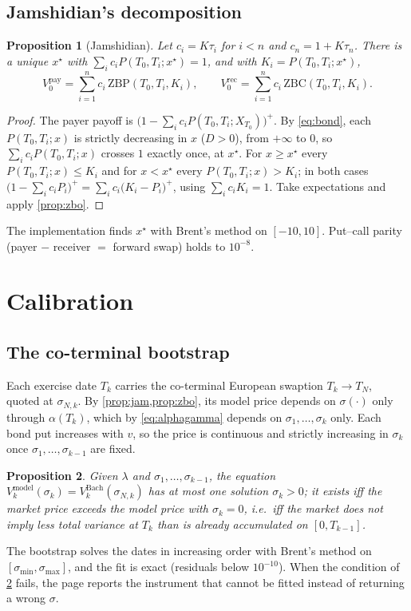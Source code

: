 \documentclass[11pt,a4paper]{article}
\newtheorem{proposition}{Proposition}
\theoremstyle{definition}
\theoremstyle{remark}
\begin{document}
\subsection{Jamshidian's decomposition}
\begin{proposition}[Jamshidian]\label{prop:jam}
Let $c_i=K\tau_i$ for $i<n$ and $c_n=1+K\tau_n$. There is a unique $x^\star$ with $\sum_ic_iP(T_0,T_i;x^\star)=1$, and with
$K_i=P(T_0,T_i;x^\star)$,
\begin{equation}
  V^{\mathrm{pay}}_0=\sum_{i=1}^nc_i\,\mathrm{ZBP}(T_0,T_i,K_i),\qquad V^{\mathrm{rec}}_0=\sum_{i=1}^nc_i\,\mathrm{ZBC}(T_0,T_i,K_i).
\end{equation}
\end{proposition}
\begin{proof}
The payer payoff is $\big(1-\sum_ic_iP(T_0,T_i;X_{T_0})\big)^+$. By \eqref{eq:bond}, each $P(T_0,T_i;x)$ is strictly decreasing
in $x$ ($D>0$), from $+\infty$ to $0$, so $\sum_ic_iP(T_0,T_i;x)$ crosses $1$ exactly once, at $x^\star$. For $x\ge x^\star$ every
$P(T_0,T_i;x)\le K_i$ and for $x<x^\star$ every $P(T_0,T_i;x)>K_i$; in both cases
$\big(1-\sum_ic_iP_i\big)^+=\sum_ic_i\big(K_i-P_i\big)^+$, using $\sum_ic_iK_i=1$. Take expectations and apply \cref{prop:zbo}.
\end{proof}
The implementation finds $x^\star$ with Brent's method on $[-10,10]$. Put--call parity (payer $-$ receiver $=$ forward swap)
holds to $10^{-8}$.

\section{Calibration}\label{sec:calibration}
\subsection{The co-terminal bootstrap}
Each exercise date $T_k$ carries the co-terminal European swaption $T_k\to T_N$, quoted at $\sigma_{N,k}$. By
\cref{prop:jam,prop:zbo}, its model price depends on $\sigma(\cdot)$ only through $\alpha(T_k)$, which by \eqref{eq:alphagamma}
depends on $\sigma_1,\dots,\sigma_k$ only. Each bond put increases with $v$, so the price is continuous and strictly
increasing in $\sigma_k$ once $\sigma_1,\dots,\sigma_{k-1}$ are fixed.
\begin{proposition}\label{prop:boot}
Given $\lambda$ and $\sigma_1,\dots,\sigma_{k-1}$, the equation $V^{\mathrm{model}}_k(\sigma_k)=V^{\mathrm{Bach}}_k(\sigma_{N,k})$
has at most one solution $\sigma_k>0$; it exists iff the market price exceeds the model price with $\sigma_k=0$, i.e.\ iff the
market does not imply less total variance at $T_k$ than is already accumulated on $[0,T_{k-1}]$.
\end{proposition}
The bootstrap solves the dates in increasing order with Brent's method on $[\sigma_{\min},\sigma_{\max}]$, and the fit is
exact (residuals below $10^{-10}$). When the condition of \cref{prop:boot} fails, the page reports the instrument that
cannot be fitted instead of returning a wrong $\sigma$.
\end{document}
